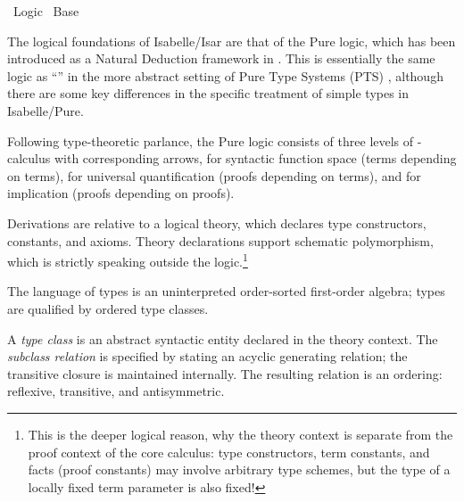 %
\begin{isabellebody}%
\def\isabellecontext{Logic}%
%
\isadelimtheory
%
\endisadelimtheory
%
\isatagtheory
{}\isamarkupfalse%
\ Logic\isanewline
{}\ Base\isanewline
{}%
\endisatagtheory
{\isafoldtheory}%
%
\isadelimtheory
%
\endisadelimtheory
%
\isamarkuptrue%
%
\begin{isamarkuptext}%
The logical foundations of Isabelle/Isar are that of the Pure logic,
  which has been introduced as a Natural Deduction framework in
  \cite{paulson700}.  This is essentially the same logic as ``'' in the more abstract setting of Pure Type Systems (PTS)
  \cite{Barendregt-Geuvers:2001}, although there are some key
  differences in the specific treatment of simple types in
  Isabelle/Pure.

  Following type-theoretic parlance, the Pure logic consists of three
  levels of -calculus with corresponding arrows,  for syntactic function space (terms depending on terms),  for universal quantification (proofs depending on terms), and
   for implication (proofs depending on proofs).

  Derivations are relative to a logical theory, which declares type
  constructors, constants, and axioms.  Theory declarations support
  schematic polymorphism, which is strictly speaking outside the
  logic.\footnote{This is the deeper logical reason, why the theory
  context  is separate from the proof context 
  of the core calculus: type constructors, term constants, and facts
  (proof constants) may involve arbitrary type schemes, but the type
  of a locally fixed term parameter is also fixed!}%
\end{isamarkuptext}%
\isamarkuptrue%
%
\isamarkuptrue%
%
\begin{isamarkuptext}%
The language of types is an uninterpreted order-sorted first-order
  algebra; types are qualified by ordered type classes.

  \medskip A \emph{type class} is an abstract syntactic entity
  declared in the theory context.  The \emph{subclass relation}  is specified by stating an acyclic
  generating relation; the transitive closure is maintained
  internally.  The resulting relation is an ordering: reflexive,
  transitive, and antisymmetric.


\end{isamarkuptext}
\end{isabellebody}
